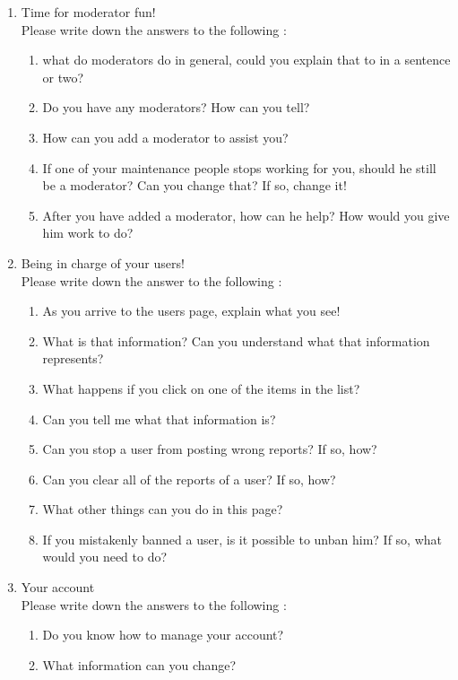 \documentclass[12pt]{article}
\begin{document}
\begin{enumerate}
\item Time for moderator fun!\\
Please write down the answers to the following :
\begin{enumerate}
\item what do moderators do in general, could you explain that to in a sentence or two?
\item Do you have any moderators? How can you tell?
\item How can you add a moderator to assist you?
\item If one of your maintenance people stops working for you, should he still be a moderator? Can you change that? If so, change it!
\item After you have added a moderator, how can he help? How would you give him work to do?
\end{enumerate}

\item Being in charge of your users!\\
Please write down the answer to the following :
\begin{enumerate}
\item As you arrive to the users page, explain what you see!
\item What is that information? Can you understand what that information represents?
\item What happens if you click on one of the items in the list?
\item Can you tell me what that information is?
\item Can you stop a user from posting wrong reports? If so, how?
\item Can you clear all of the reports of a user? If so, how?
\item What other things can you do in this page?
\item If you mistakenly banned a user, is it possible to unban him? If so, what would you need to do?
\end{enumerate}

\item Your account\\
Please write down the answers to the following :
\begin{enumerate}
\item Do you know how to manage your account?
\item What information can you change?
\end{enumerate}


\end{enumerate}
\end{document}
